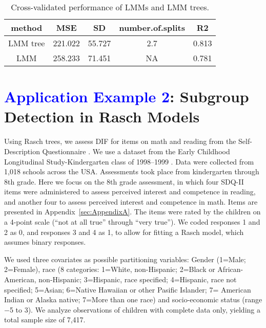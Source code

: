 \documentclass[doc,floatsintext,natbib]{apa7}
\newcommand{\edc}[1]{\textcolor{blue}{#1}}
\begin{document}
\begin{table}

\caption{\label{tab:performance}Cross-validated performance of LMMs and LMM trees.}
\begin{tabular}[t]{ccccc}
\toprule
method & MSE & SD & number.of.splits & R2\\
\midrule
LMM tree & 221.022 & 55.727 & 2.7 & 0.813\\
LMM & 258.233 & 71.451 & NA & 0.781\\
\bottomrule
\end{tabular}
\end{table}





\newpage
\FloatBarrier
\section{\edc{Application Example 2}: Subgroup Detection in Rasch Models}
\label{sec:TutorialRasch}

Using Rasch trees, we assess DIF for items on math and reading  from the Self-Description Questionnaire \cite{Boyl94}. We use a dataset from the Early Childhood Longitudinal Study-Kindergarten class of 1998--1999 \citep[ECLS-K; ][]{NCES10}. Data were collected from 1,018 schools across the USA. Assessments took place from kindergarten through 8th grade. Here we focus on the 8th grade assessment, in which four SDQ-II items were administered to assess perceived interest and competence in reading, and another four to assess perceived interest and competence in math. Items are presented in Appendix~\ref{sec:AppendixA}. The items were rated by the children on a 4-point scale (“not at all true” through “very true”). We coded responses 1 and 2 as 0, and responses 3 and 4 as 1, to allow for fitting a Rasch model, which assumes binary responses. 


We used three covariates as possible partitioning variables: Gender (1=Male; 2=Female), race (8 categories: 1=White, non-Hispanic; 2=Black or African-American, non-Hispanic; 3=Hispanic, race specified; 4=Hispanic, race not specified; 5=Asian; 6=Native Hawaiian or other Pasific Islander; 7= American Indian or Alaska native; 7=More than one race) and socio-economic status (range $-$5 to 3).  We analyze observations of children with complete data only, yielding a total sample size of 7,417.
\end{document}
